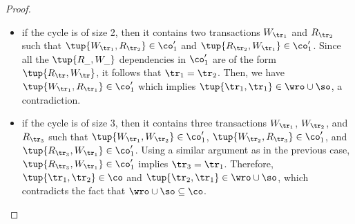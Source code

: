 \begin{proof}
\begin{itemize}
  \item if the cycle is of size 2, then it contains two transactions $W_{\tr_1}$ and $R_{\tr_2}$ such that $\tup{W_{\tr_1}, R_{\tr_2}}\in\co'_1$ and $\tup{R_{\tr_2}, W_{\tr_1}}\in \co'_1$. Since all the $\tup{R_{\_}, W_{\_}}$ dependencies in $\co'_1$ are of the form $\tup{R_\tr, W_\tr}$, it follows that $\tr_1 = \tr_2$. Then, we have $\tup{W_{\tr_1}, R_{\tr_1}} \in \co'_1$ which implies $\tup{\tr_1, \tr_1} \in \wro \cup \so$, a contradiction.
  \item if the cycle is of size 3, then it contains three transactions $W_{\tr_1}$, $W_{\tr_2}$, and $R_{\tr_3}$ such that $\tup{W_{\tr_1}, W_{\tr_2}}\in \co'_1$,  $\tup{W_{\tr_2}, R_{\tr_3}}\in \co'_1$, and $\tup{R_{\tr_3}, W_{\tr_1}} \in \co'_1$. Using a similar argument as in the previous case, $\tup{R_{\tr_3}, W_{\tr_1}} \in \co'_1$ implies $\tr_3 = \tr_1$. Therefore, $\tup{\tr_1, \tr_2} \in \co$ and $\tup{\tr_2, \tr_1} \in \wro \cup \so$, which contradicts the fact that $\wro \cup \so\subseteq \co$.
 \end{itemize}
 \end{proof}
 
